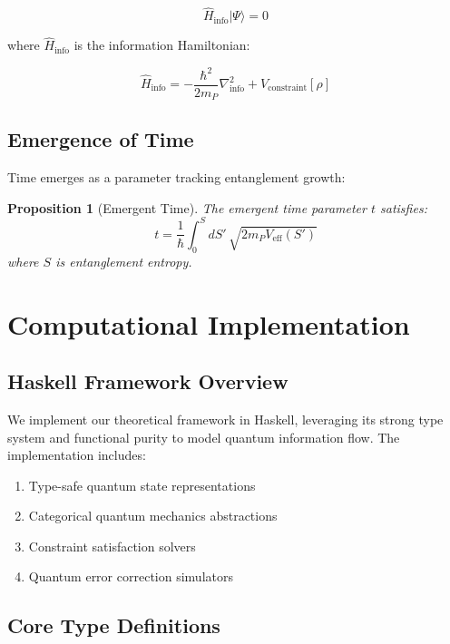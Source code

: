 \documentclass[12pt,a4paper]{article}
\newtheorem{proposition}[theorem]{Proposition}
\begin{document}
\begin{equation}
\hat{H}_{\text{info}}|\Psi\rangle = 0
\end{equation}

where $\hat{H}_{\text{info}}$ is the information Hamiltonian:

\begin{equation}
\hat{H}_{\text{info}} = -\frac{\hbar^2}{2m_P} \nabla^2_{\text{info}} + V_{\text{constraint}}[\rho]
\end{equation}

\subsection{Emergence of Time}

Time emerges as a parameter tracking entanglement growth:

\begin{proposition}[Emergent Time]
The emergent time parameter $t$ satisfies:
\begin{equation}
t = \frac{1}{\hbar} \int_0^S dS' \, \sqrt{2m_P V_{\text{eff}}(S')}
\end{equation}
where $S$ is entanglement entropy.
\end{proposition}

\section{Computational Implementation}

\subsection{Haskell Framework Overview}

We implement our theoretical framework in Haskell, leveraging its strong type system and functional purity to model quantum information flow. The implementation includes:

\begin{enumerate}
\item Type-safe quantum state representations
\item Categorical quantum mechanics abstractions  
\item Constraint satisfaction solvers
\item Quantum error correction simulators
\end{enumerate}

\subsection{Core Type Definitions}
\end{document}
